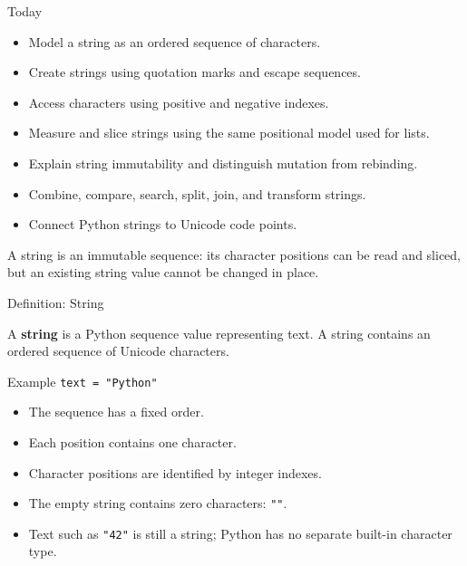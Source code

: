 \documentclass[aspectratio=169,10pt]{beamer}
\begin{document}
\makedecktitle

\begin{frame}{Today}
  \begin{itemize}
    \item Model a string as an ordered sequence of characters.
    \item Create strings using quotation marks and escape sequences.
    \item Access characters using positive and negative indexes.
    \item Measure and slice strings using the same positional model used for lists.
    \item Explain string immutability and distinguish mutation from rebinding.
    \item Combine, compare, search, split, join, and transform strings.
    \item Connect Python strings to Unicode code points.
  \end{itemize}

  \begin{keyidea}
    A string is an immutable sequence: its character positions can be read and sliced, but an existing string value cannot be changed in place.
  \end{keyidea}
\end{frame}


\begin{frame}{Definition: String}
  \begin{cpdefinition}
    A \textbf{string} is a Python sequence value representing text. A string contains an ordered sequence of Unicode characters.
  \end{cpdefinition}

  \begin{block}{Example}
    \centering
    \Large\texttt{text = "Python"}
  \end{block}

  \begin{itemize}
    \item The sequence has a fixed order.
    \item Each position contains one character.
    \item Character positions are identified by integer indexes.
    \item The empty string contains zero characters: \texttt{""}.
    \item Text such as \texttt{"42"} is still a string; Python has no separate built-in character type.
  \end{itemize}
\end{frame}
\end{document}
